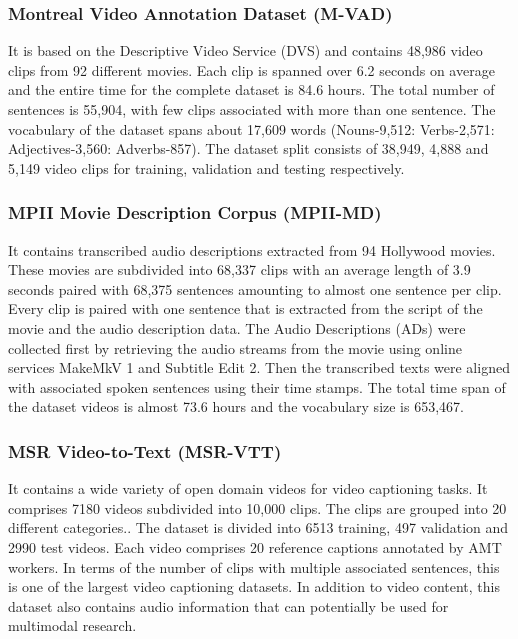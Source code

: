 \subsubsection{Montreal Video Annotation Dataset (M-VAD)}

\par It is based on the Descriptive Video Service (DVS) and contains 48,986 video clips from 92 different movies. Each clip is spanned over 6.2 seconds on average and the entire time for the complete dataset is 84.6 hours. The total number of sentences is 55,904, with few clips associated with more than one sentence. The vocabulary of the dataset spans about 17,609 words (Nouns-9,512: Verbs-2,571: Adjectives-3,560: Adverbs-857). The dataset split consists of 38,949, 4,888 and 5,149 video clips for training, validation and testing respectively.


\subsubsection{MPII Movie Description Corpus (MPII-MD)}

\par It contains transcribed audio descriptions extracted from 94 Hollywood movies. These movies are subdivided into 68,337 clips with an average length of 3.9 seconds paired with 68,375 sentences amounting to almost one sentence per clip. Every clip is paired with one sentence that is extracted from the script of the movie and the audio description data. The Audio Descriptions (ADs) were collected first by retrieving the audio streams from the movie using online services MakeMkV 1 and Subtitle Edit 2. Then the transcribed texts were aligned with associated spoken sentences using their time stamps. The total time span of the dataset videos is almost 73.6 hours and the vocabulary size is 653,467.

\subsubsection{MSR Video-to-Text (MSR-VTT)}

\par It contains a wide variety of open domain videos for video captioning tasks. It comprises 7180 videos subdivided into 10,000 clips. The clips are grouped into 20 different categories.. The dataset is divided into 6513 training, 497 validation and 2990 test videos. Each video comprises 20 reference captions annotated by AMT workers. In terms of the number of clips with multiple associated sentences, this is one of the largest video captioning datasets. In addition to video content, this dataset also contains audio information that can potentially be used for multimodal research.

